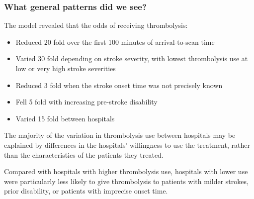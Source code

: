 \documentclass{beamer}
\begin{document}
\begin{frame}
\frametitle{What general patterns did we see?}

The  model revealed that the odds of receiving thrombolysis:
\vspace{1mm}
\begin{itemize}
    \item Reduced 20 fold over the first 100 minutes of arrival-to-scan time
    \item Varied 30 fold depending on stroke severity, with lowest thrombolysis use at low or very high stroke severities
    \item Reduced 3 fold when the stroke onset time was not precisely known
    \item Fell 5 fold with increasing pre-stroke disability
    \item Varied 15 fold between hospitals
\end{itemize}

\vspace{2mm}

The majority of the variation in thrombolysis use between hospitals may be explained by differences in the hospitals’ willingness to use the treatment, rather than the characteristics of the patients they treated.

\vspace{2mm}

Compared with hospitals with higher thrombolysis use, hospitals with lower use were particularly less likely to give thrombolysis to patients with milder strokes, prior disability, or patients with imprecise onset time.

\end{frame}

\end{document}
